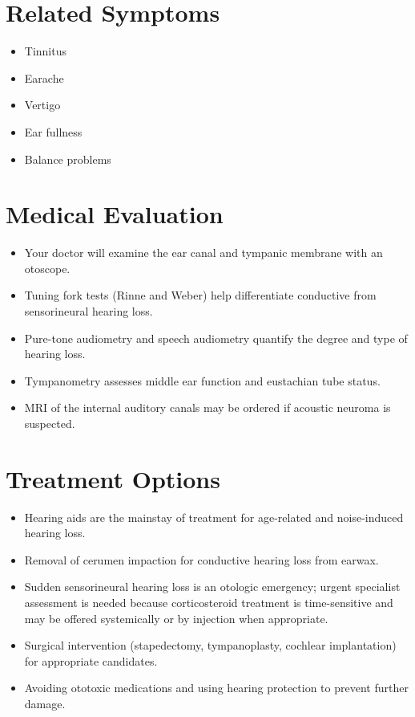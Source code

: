 \section*{Related Symptoms}
\begin{itemize}
  \item Tinnitus
  \item Earache
  \item Vertigo
  \item Ear fullness
  \item Balance problems
\end{itemize}

\section*{Medical Evaluation}
\begin{itemize}
  \item Your doctor will examine the ear canal and tympanic membrane with an otoscope.
  \item Tuning fork tests (Rinne and Weber) help differentiate conductive from sensorineural hearing loss.
  \item Pure-tone audiometry and speech audiometry quantify the degree and type of hearing loss.
  \item Tympanometry assesses middle ear function and eustachian tube status.
  \item MRI of the internal auditory canals may be ordered if acoustic neuroma is suspected.
\end{itemize}

\section*{Treatment Options}
\begin{itemize}
  \item Hearing aids are the mainstay of treatment for age-related and noise-induced hearing loss.
  \item Removal of cerumen impaction for conductive hearing loss from earwax.
  \item Sudden sensorineural hearing loss is an otologic emergency; urgent specialist assessment is needed because corticosteroid treatment is time-sensitive and may be offered systemically or by injection when appropriate.
  \item Surgical intervention (stapedectomy, tympanoplasty, cochlear implantation) for appropriate candidates.
  \item Avoiding ototoxic medications and using hearing protection to prevent further damage.
\end{itemize}

